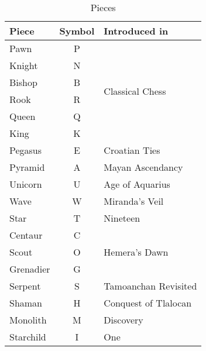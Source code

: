 \begin{table}[!h]
\centering
\begin{tabular}{ lcl }
\toprule %
\textbf{Piece} & \textbf{Symbol} & \textbf{Introduced in}           \\
\midrule %
Pawn           & P               & \multirow{6}{*}{Classical Chess} \\
Knight         & N               &                                  \\
Bishop         & B               &                                  \\
Rook           & R               &                                  \\
Queen          & Q               &                                  \\
King           & K               &                                  \\
\cmidrule{1-3} %
Pegasus        & E               & Croatian Ties                    \\
Pyramid        & A               & Mayan Ascendancy                 \\
Unicorn        & U               & Age of Aquarius                  \\
Wave           & W               & Miranda's Veil                   \\
Star           & T               & Nineteen                         \\
\cmidrule{1-3} %
Centaur        & C               & \multirow{3}{*}{Hemera's Dawn}   \\
Scout          & O               &                                  \\
Grenadier      & G               &                                  \\
\cmidrule{1-3} %
Serpent        & S               & Tamoanchan Revisited             \\
Shaman         & H               & Conquest of Tlalocan             \\
Monolith       & M               & Discovery                        \\
Starchild      & I               & One                              \\
\bottomrule %
\end{tabular}
\caption{Pieces}
\label{tbl:Appendix/Introduction/Pieces}
\end{table}

